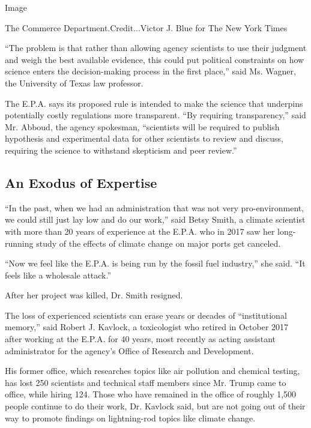 Image

The Commerce Department.Credit...Victor J. Blue for The New York Times

``The problem is that rather than allowing agency scientists to use
their judgment and weigh the best available evidence, this could put
political constraints on how science enters the decision-making process
in the first place,'' said Ms. Wagner, the University of Texas law
professor.

The E.P.A. says its proposed rule is intended to make the science that
underpins potentially costly regulations more transparent. ``By
requiring transparency,'' said Mr. Abboud, the agency spokesman,
``scientists will be required to publish hypothesis and experimental
data for other scientists to review and discuss, requiring the science
to withstand skepticism and peer review.''

\hypertarget{an-exodus-of-expertise}{%
\subsection{An Exodus of Expertise}\label{an-exodus-of-expertise}}

``In the past, when we had an administration that was not very
pro-environment, we could still just lay low and do our work,'' said
Betsy Smith, a climate scientist with more than 20 years of experience
at the E.P.A. who in 2017 saw her long-running study of the effects of
climate change on major ports get canceled.

``Now we feel like the E.P.A. is being run by the fossil fuel
industry,'' she said. ``It feels like a wholesale attack.''

After her project was killed, Dr. Smith resigned.

The loss of experienced scientists can erase years or decades of
``institutional memory,'' said Robert J. Kavlock, a toxicologist who
retired in October 2017 after working at the E.P.A. for 40 years, most
recently as acting assistant administrator for the agency's Office of
Research and Development.

His former office, which researches topics like air pollution and
chemical testing, has lost 250 scientists and technical staff members
since Mr. Trump came to office, while hiring 124. Those who have
remained in the office of roughly 1,500 people continue to do their
work, Dr. Kavlock said, but are not going out of their way to promote
findings on lightning-rod topics like climate change.

